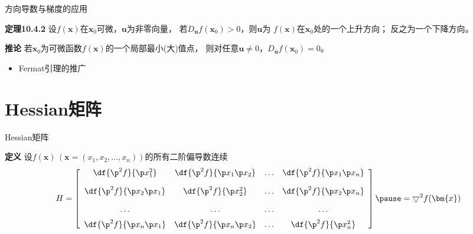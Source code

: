 \begin{frame}{方向导数与梯度的应用}
	\linespread{1.2}\pause 
	\begin{block}{{\bf 定理10.4.2}\hfill}
		设$f(\bm{x})$在$\bm{x}_0$可微，$\bm{u}$为非零向量，
		若$D_{\bm{u}}f(\bm{x}_0)>0$，则$\bm{u}$为
		  $f(\bm{x})$在$\bm{x}_0$处的一个{\bb 上升方向}；\pause 
		  反之为一个{\bb 下降方向}。
	\end{block}\pause 
	\begin{block}{{\bf 推论}\hfill}
		  若$\bm{x}_0$为可微函数$f(\bm{x})$的一个{\bb 局部最小(大)值}点，
		  则对任意$\bm{u}\ne 0$，$D_{\bm{u}}f(\bm{x}_0)=0$。
	\end{block}
	\begin{itemize}\pause 
	  \item Fermat引理的推广
	\end{itemize}
\end{frame}

\section{Hessian矩阵}

\begin{frame}{Hessian矩阵}
	\linespread{1.2}\pause 
	\begin{block}{{\bf 定义}\hfill}
		设$f(\bm{x})\,(\bm{x}=(x_1,x_2,\ldots,x_n))$的所有二阶偏导数连续\pause 
		$$H=\left[\begin{array}{cccc}
			\df{\p^2 f}{\p x_1^2} & \df{\p^2 f}{\p x_1\p x_2} & \ldots & \df{\p^2
			f}{\p x_1\p x_n}\\[10pt]
			\df{\p^2 f}{\p x_2\p x_1} & \df{\p^2 f}{\p x_2^2} & \ldots & \df{\p^2
			f}{\p x_2\p x_n}\\[10pt]
			\ldots & \ldots & \ldots & \ldots\\[6pt]
			\df{\p^2 f}{\p x_n\p x_1} & \df{\p^2 f}{\p x_n\p x_2} & \ldots & \df{\p^2
			f}{\p x_n^2}
			\end{array}\right]
		\pause =\bigtriangledown^2 f(\bm{x})$$
	\end{block}
\end{frame}


